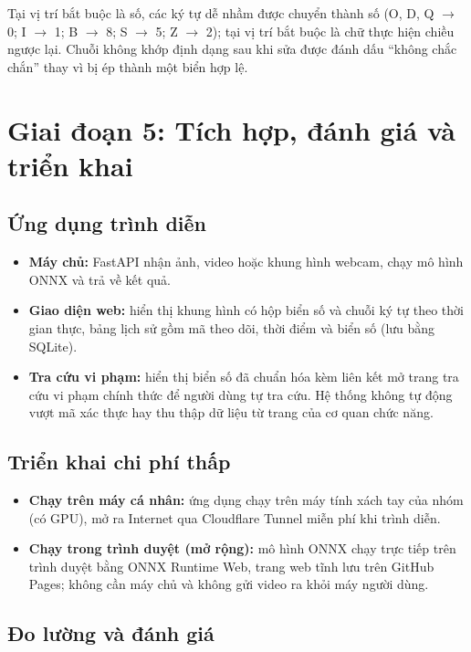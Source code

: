 Tại vị trí bắt buộc là số, các ký tự dễ nhầm được chuyển thành số (O, D, Q $\to$ 0; I $\to$ 1; B $\to$ 8; S $\to$ 5; Z $\to$ 2); tại vị trí bắt buộc là chữ thực hiện chiều ngược lại. Chuỗi không khớp định dạng sau khi sửa được đánh dấu ``không chắc chắn'' thay vì bị ép thành một biển hợp lệ.

\section{Giai đoạn 5: Tích hợp, đánh giá và triển khai}

\subsection{Ứng dụng trình diễn}

\begin{itemize}
  \item \textbf{Máy chủ:} FastAPI nhận ảnh, video hoặc khung hình webcam, chạy mô hình ONNX và trả về kết quả.
  \item \textbf{Giao diện web:} hiển thị khung hình có hộp biển số và chuỗi ký tự theo thời gian thực, bảng lịch sử gồm mã theo dõi, thời điểm và biển số (lưu bằng SQLite).
  \item \textbf{Tra cứu vi phạm:} hiển thị biển số đã chuẩn hóa kèm liên kết mở trang tra cứu vi phạm chính thức để người dùng tự tra cứu. Hệ thống không tự động vượt mã xác thực hay thu thập dữ liệu từ trang của cơ quan chức năng.
\end{itemize}

\subsection{Triển khai chi phí thấp}

\begin{itemize}
  \item \textbf{Chạy trên máy cá nhân:} ứng dụng chạy trên máy tính xách tay của nhóm (có GPU), mở ra Internet qua Cloudflare Tunnel miễn phí khi trình diễn.
  \item \textbf{Chạy trong trình duyệt (mở rộng):} mô hình ONNX chạy trực tiếp trên trình duyệt bằng ONNX Runtime Web, trang web tĩnh lưu trên GitHub Pages; không cần máy chủ và không gửi video ra khỏi máy người dùng.
\end{itemize}

\subsection{Đo lường và đánh giá}

